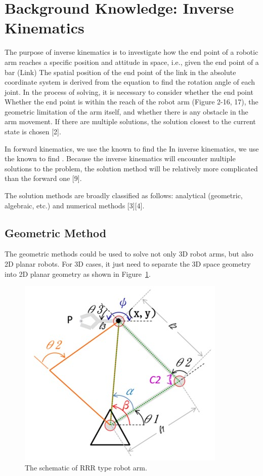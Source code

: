 \documentclass[journal,article,submit,pdftex,moreauthors]{Definitions/mdpi}
\begin{document}
\section{Background Knowledge: Inverse Kinematics}
The purpose of inverse kinematics is to investigate how the end point of a robotic arm reaches a specific position and attitude in space, i.e., given the end point of a bar (Link)  The spatial position of the end point of the link in the absolute coordinate system is derived from the equation to find the rotation angle of each joint. In the process of solving, it is necessary to consider whether the end point  Whether the end point is within the reach of the robot arm (Figure 2-16, 17), the geometric limitation of the arm itself, and whether there is any obstacle in the arm movement. If there are multiple solutions, the solution closest to the current state is chosen [2].

In forward kinematics, we use the known  to find the  In inverse kinematics, we use the known  to find  . Because the inverse kinematics will encounter multiple solutions to the problem, the solution method will be relatively more complicated than the forward one [9].

The solution methods are broadly classified as follows: analytical (geometric, algebraic, etc.) and numerical methods [3][4].

\subsection{Geometric Method}
The geometric methods could be used to solve not only 3D robot arms, but also 2D planar robots. For 3D cases, it just need to separate the 3D space geometry into 2D planar geometry as shown in Figure~\ref{fig1}.

\begin{figure}[H]
\includegraphics[width=10.5 cm]{Definitions/fig1}
\caption{The schematic of RRR type robot arm.\label{fig1}}
\end{figure}   
\end{document}
